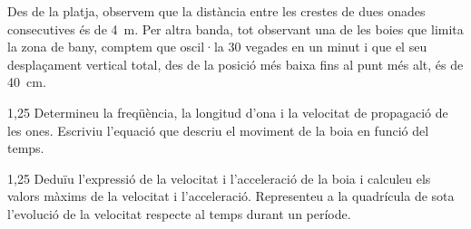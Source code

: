 Des de la platja, observem que la distància entre les crestes de dues onades consecutives és de 4~m. Per altra banda, tot observant una de les boies que limita la zona de bany, comptem que oscil·la 30 vegades en un minut i que el seu desplaçament vertical total, des de la posició més baixa fins al punt més alt, és de 40~cm.

\begin{apartat}{1,25}
Determineu la freqüència, la longitud d'ona i la velocitat de propagació de les ones. Escriviu l'equació que descriu el moviment de la boia en funció del temps.
\end{apartat}

\begin{apartat}{1,25}
Deduïu l'expressió de la velocitat i l'acceleració de la boia i calculeu els valors màxims de la velocitat i l'acceleració. Representeu a la quadrícula de sota l'evolució de la velocitat respecte al temps durant un període.
\end{apartat}


